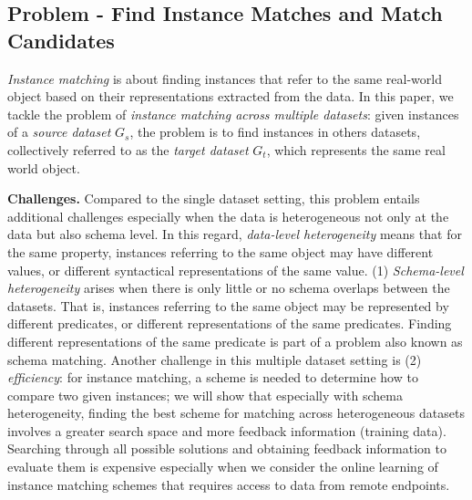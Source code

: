 \subsection{Problem - Find Instance Matches and Match Candidates} \emph{Instance matching} is about finding instances that refer to the same real-world object based on their representations extracted from the data. In this paper, we tackle the problem of \emph{instance matching across multiple datasets}: given instances of a \emph{source dataset} $G_s$, the problem is to find instances in others datasets, collectively referred to as the \emph{target dataset} $G_t$, which represents the same real world object. 

\textbf{Challenges.} Compared to the single dataset setting, this problem entails additional challenges especially when the data is heterogeneous not only at the data but also schema level. In this regard, \emph{data-level heterogeneity} means that for the same property, instances referring to the same object may have different values, or different syntactical representations of the same value.  (1) \emph{Schema-level heterogeneity} arises when there is only little or no schema overlaps between the datasets. That is, instances referring to the same object may be represented by different predicates, or different representations of the same predicates. Finding different representations of the same predicate is part of a problem also known as schema matching. Another challenge in this multiple dataset setting is (2) \emph{efficiency}: for instance matching, a scheme is needed to determine how to compare two given instances; we will show that especially with schema heterogeneity, finding the best scheme for matching across heterogeneous datasets involves a greater search space and more feedback information (training data). Searching through all possible solutions and obtaining feedback information to evaluate them is expensive especially when we consider the online learning of instance matching schemes that requires access to data from remote endpoints. 

